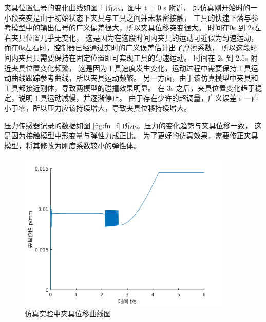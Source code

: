 夹具位置信号的变化曲线如图 \ref{fig:p_f} 所示。图中 t = 0 s 附近，
即仿真刚开始时的一小段突变是由于初始状态下夹具与工具之间并未紧密接触，
工具的快速下落与参考模型中的输出信号的广义偏差很大，所以夹具位移突变很大。
时间在0s 到 2s左右夹具位置几乎无变化， 这是因为在这段时间内夹具的运动可近似为匀速运动，
而在0s左右时，控制器已经通过实时的广义误差估计出了摩擦系数，
所以这段时间内夹具只需要保持在固定位置即可实现工具的匀速运动。
时间在 2s 到 2.5s 附近夹具位置变化频繁，
这是因为工具速度发生变化，运动过程中需要保持工具运动曲线跟踪参考曲线，所以夹具运动频繁。
另一方面，由于该仿真模型中夹具和工具都接近刚体，导致两模型的碰撞效果明显。
在 3s 之后，夹具位置变化趋于稳定，说明工具运动减慢，并逐渐停止。
由于存在少许的超调量，广义误差 s 一直小于零，所以压力应该持续增大，导致夹具位移持续增大。


压力传感器记录的数据如图 \ref{fig:fn_f} 所示。压力的变化趋势与夹具位移一致，
这是因为接触模型中形变量与弹性力成正比。
为了更好的仿真效果，需要修正夹具模型，将其修改为刚度系数较小的弹性体。

\begin{figure}[!ht]
  \centering
  \includegraphics[width=10.2cm]{chapter04/pic/p_f}
  \caption{\label{fig:p_f}
    仿真实验中夹具位移曲线图}
  \vspace{-0.3cm}
\end{figure}

